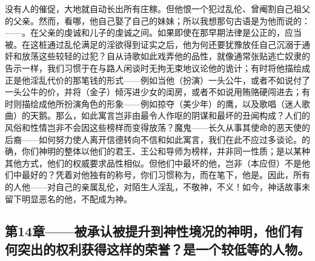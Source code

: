 没有人的催促，大地就自动长出所有庄稼。但他恨一个犯过乱伦、曾阉割自己祖父的父亲。然而，看哪，他自己娶了自己的妹妹；所以我想那句古语是为他而说的：——。在父亲的虔诚和儿子的虔诚之间。如果即使在那早期法律是公正的，应当被。在这桩通过乱伦满足的淫欲得到证实之后，他为何还要犹豫放任自己沉溺于通奸和放荡这些较轻的过犯？自从诗歌如此戏弄他的品性，就像通常张贴逃亡奴隶的告示一样，我们习惯于在与路人闲谈时无拘无束地议论他的诡计；有时将他描绘成正是他淫乱代价的那笔钱的形式——例如当他（扮演）一头公牛，或者不如说付了一头公牛的价，并将（金子）倾泻进少女的闺房，或者不如说用贿赂硬闯进去；有时则描绘成他所扮演角色的形象——例如掠夺（美少年）的鹰，以及歌唱（迷人歌曲）的天鹅。那么，如此寓言岂非由最令人作呕的阴谋和最坏的丑闻构成？人们的风俗和性情岂非不会因这些榜样而变得放荡？魔鬼——长久从事其使命的恶天使的后裔——如何努力使人离开信德转向不信和如此寓言，我们在此不应过多谈论。的确，你们神明的整体以他们的君王、王公和导师为榜样，并非同一性质；是以某种其他方式，他们的权威要求品性相似。但他们中最坏的他，岂非（本应但）不是他们中最好的？凭着对他独有的称号，你们习惯称为，而在笔下，他是。因此，所有的人他——对自己的亲属乱伦，对陌生人淫乱，不敬神，不义！如今，神话故事未留下明显恶名的他，不配成为神。\par


\subsection{第14章——被承认被提升到神性境况的神明，他们有何突出的权利获得这样的荣誉？是一个较低等的人物。}

